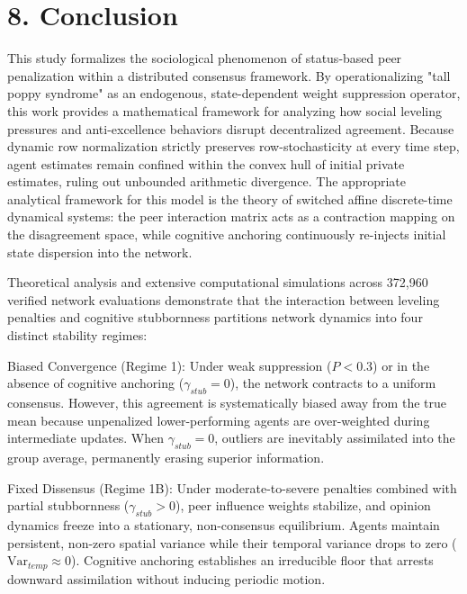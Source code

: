\section{8. Conclusion}
This study formalizes the sociological phenomenon of status-based peer penalization within a distributed consensus framework\cite{degroot1974reaching}. By operationalizing "tall poppy syndrome" as an endogenous, state-dependent weight suppression operator, this work provides a mathematical framework for analyzing how social leveling pressures and anti-excellence behaviors disrupt decentralized agreement\cite{degroot1974reaching}. Because dynamic row normalization strictly preserves row-stochasticity at every time step, agent estimates remain confined within the convex hull of initial private estimates, ruling out unbounded arithmetic divergence\cite{degroot1974reaching}. The appropriate analytical framework for this model is the theory of switched affine discrete-time dynamical systems: the peer interaction matrix acts as a contraction mapping on the disagreement space, while cognitive anchoring continuously re-injects initial state dispersion into the network\cite{acemoglu2013opinion,hajnal1958weak}.

Theoretical analysis and extensive computational simulations across 372,960 verified network evaluations demonstrate that the interaction between leveling penalties and cognitive stubbornness partitions network dynamics into four distinct stability regimes\cite{degroot1974reaching,acemoglu2013opinion}:

Biased Convergence (Regime 1): Under weak suppression ($P < 0.3$) or in the absence of cognitive anchoring ($\gamma_{stub} = 0$), the network contracts to a uniform consensus\cite{degroot1974reaching,acemoglu2013opinion}. However, this agreement is systematically biased away from the true mean because unpenalized lower-performing agents are over-weighted during intermediate updates\cite{degroot1974reaching}. When $\gamma_{stub} = 0$, outliers are inevitably assimilated into the group average, permanently erasing superior information\cite{degroot1974reaching}.

Fixed Dissensus (Regime 1B): Under moderate-to-severe penalties combined with partial stubbornness ($\gamma_{stub} > 0$), peer influence weights stabilize, and opinion dynamics freeze into a stationary, non-consensus equilibrium\cite{acemoglu2013opinion}. Agents maintain persistent, non-zero spatial variance while their temporal variance drops to zero ($\text{Var}_{temp} \approx 0$)\cite{acemoglu2013opinion}. Cognitive anchoring establishes an irreducible floor that arrests downward assimilation without inducing periodic motion\cite{degroot1974reaching,acemoglu2013opinion}.

